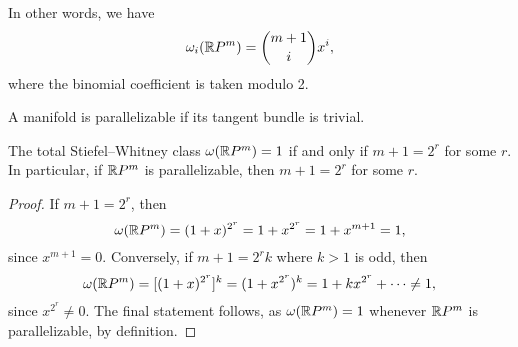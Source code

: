 \documentclass[ma3408.tex]{subfiles}
\begin{document}
\begin{Rem}
In other words, we have
\begin{equation}\label{eq:sw-rpn}
\omega_i(\mathbb{R} P^m) = \binom{m+1}{i}x^i,
\end{equation}
where the binomial coefficient is taken modulo 2. 
\end{Rem}
\begin{Def}
A manifold is parallelizable if its tangent bundle is trivial. 
\end{Def}
\begin{Cor}
The total Stiefel--Whitney class $\omega(\mathbb{R} P^m) =1$ if and only if $m + 1 = 2^r$ for some $r$. In particular, if $\mathbb{R} P^m$ is parallelizable, then $m+1 = 2^r$ for some $r$.
\end{Cor}
\begin{proof}
If $m + 1 = 2^r$, then 
\[
\omega(\mathbb{R} P^m) = (1+x)^{2^r} = 1+x^{2^r} = 1+x^{m+1} = 1,
\]
since $x^{m+1} = 0$. Conversely, if $m+1=2^rk$ where $k>1$ is odd, then 
\[
\omega(\mathbb{R} P^m) = [(1+x)^{2^r}]^k = (1+x^{2^r})^k = 1+kx^{2^r} + \cdots \ne 1,
\]
since $x^{2^r} \ne 0$. The final statement follows, as $\omega(\mathbb{R} P^m) = 1$ whenever $\mathbb{R} P^m$ is parallelizable, by definition. 
\end{proof}
\end{document}
